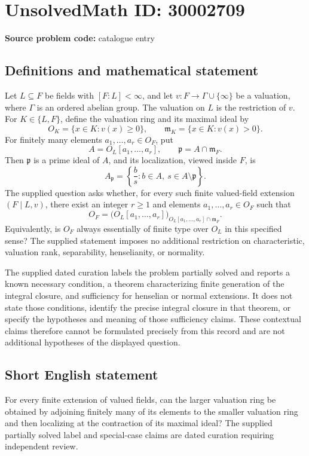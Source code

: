 \documentclass[11pt]{article}
\begin{document}
\section*{UnsolvedMath ID: 30002709}
\textbf{Source problem code:} catalogue entry
\subsection{Definitions and mathematical statement}
Let \(L\subseteq F\) be fields with \([F:L]<\infty\), and let \(v:F\to\Gamma\cup\{\infty\}\) be a valuation, where \(\Gamma\) is an ordered abelian group. The valuation on \(L\) is the restriction of \(v\). For \(K\in\{L,F\}\), define the valuation ring and its maximal ideal by
\[
O_K=\{x\in K:v(x)\geq 0\},\qquad
\mathfrak m_K=\{x\in K:v(x)>0\}.
\]
For finitely many elements \(a_1,\ldots,a_r\in O_F\), put
\[
A=O_L[a_1,\ldots,a_r],\qquad \mathfrak p=A\cap\mathfrak m_F.
\]
Then \(\mathfrak p\) is a prime ideal of \(A\), and its localization, viewed inside \(F\), is
\[
A_{\mathfrak p}=\left\{\frac{b}{s}:b\in A,\ s\in A\setminus\mathfrak p\right\}.
\]
The supplied question asks whether, for every such finite valued-field extension \((F\mid L,v)\), there exist an integer \(r\geq 1\) and elements \(a_1,\ldots,a_r\in O_F\) such that
\[
O_F=\bigl(O_L[a_1,\ldots,a_r]\bigr)_{O_L[a_1,\ldots,a_r]\cap\mathfrak m_F}.
\]
Equivalently, is \(O_F\) always essentially of finite type over \(O_L\) in this specified sense? The supplied statement imposes no additional restriction on characteristic, valuation rank, separability, henselianity, or normality.

The supplied dated curation labels the problem partially solved and reports a known necessary condition, a theorem characterizing finite generation of the integral closure, and sufficiency for henselian or normal extensions. It does not state those conditions, identify the precise integral closure in that theorem, or specify the hypotheses and meaning of those sufficiency claims. These contextual claims therefore cannot be formulated precisely from this record and are not additional hypotheses of the displayed question.
\subsection{Short English statement}
For every finite extension of valued fields, can the larger valuation ring be obtained by adjoining finitely many of its elements to the smaller valuation ring and then localizing at the contraction of its maximal ideal? The supplied partially solved label and special-case claims are dated curation requiring independent review.
\end{document}

